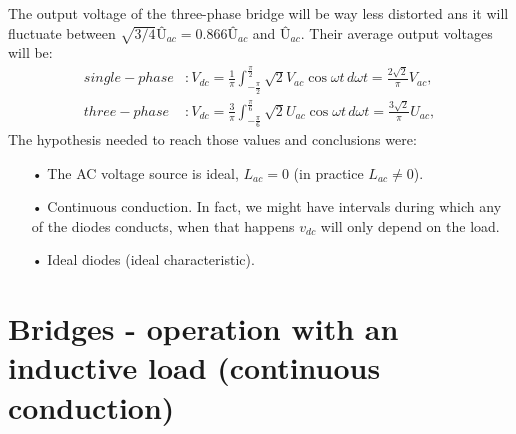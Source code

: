 	The output voltage of the three-phase bridge will be way less distorted ans it will fluctuate between $\sqrt{3/4}Û_{ac} = 0.866 Û_{ac}$ and $Û_{ac}$. Their average output voltages will be:
	\begin{equation}
		\begin{aligned}
		single-phase &: V_{dc} = \frac{1}{\pi}\int _{-\frac{\pi}{2}} ^ {\frac{\pi}{2}} \sqrt{2} V_{ac} \cos \omega t \, d\omega t = \frac{2\sqrt{2}}{\pi} V_{ac},\\
		three-phase &: V_{dc} = \frac{3}{\pi}\int _{-\frac{\pi}{6}} ^ {\frac{\pi}{6}} \sqrt{2} U_{ac} \cos \omega t \, d\omega t = \frac{3\sqrt{2}}{\pi} U_{ac},
		\end{aligned}
		\label{eq:2.14}
	\end{equation}
	The hypothesis needed to reach those values and conclusions were: 
	\begin{itemize}
		\item[•] The AC voltage source is ideal, $L_{ac} = 0$ (in practice $L_{ac}\neq 0$). 
		\item[•] Continuous conduction. In fact, we might have intervals during which any of the diodes conducts, when that happens $v_{dc}$ will only depend on the load. 
		\item[•] Ideal diodes (ideal characteristic). 
	\end{itemize}
	
\section{Bridges - operation with an inductive load (continuous conduction)}
